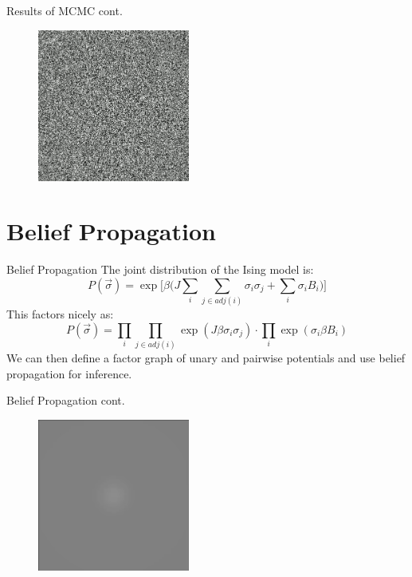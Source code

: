 \documentclass{minesbeamer}
\begin{document}
\begin{frame}{Results of MCMC cont.}
    \centering
    \begin{figure}
    \href{https://drive.google.com/file/d/1rxzwuteOm7bDoig8iRXaAgJcydNfbF3O/view?usp=drive_link}{\includegraphics[width = 5 cm, height = 5cm]{mcmc.png}}
    \end{figure}
\end{frame}

\section{Belief Propagation}

\begin{frame}{Belief Propagation}
    \centering
    The joint distribution of the Ising model is:
    \[
    P(\vec{\sigma}) = \exp \Bigr [ \beta \Bigr ( J\sum_i \sum_{j \in adj(i)} \sigma_i \sigma_j + \sum_i \sigma_i B_i \Bigr ) \Bigr ]
    \]
    This factors nicely as:
    \[
    P(\vec{\sigma}) = \prod_i \prod_{j \in adj(i)} \exp (J \beta \sigma_i \sigma_j) \cdot \prod_i \exp(\sigma_i \beta B_i)
    \]
    We can then define a factor graph of unary and pairwise potentials and use 
    belief propagation for inference. 
\end{frame}

\begin{frame}{Belief Propagation cont.}
    \centering
    \begin{figure}
    \href{https://drive.google.com/file/d/1EIDcN95oOABF0ZoCHTdMfJtEQk6D3qU0/view?usp=drive_link}{\includegraphics[width = 5 cm, height = 5cm]{bp.png}}
    \end{figure}
\end{frame}
\end{document}
